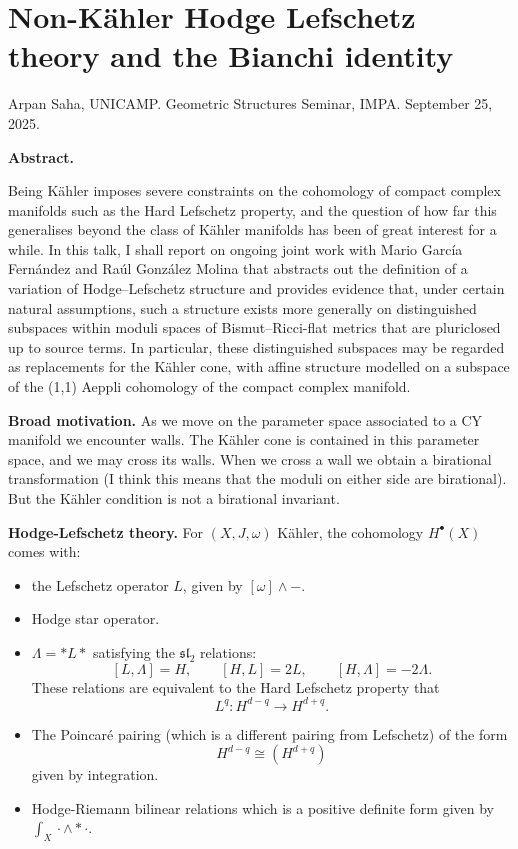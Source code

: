 \section{Non-Kähler Hodge Lefschetz theory
and the Bianchi identity}
\label{section-non-kahler-hodge-lefschetz-theory-and-bianchi-identity}

\noindent
Arpan Saha, UNICAMP.
Geometric Structures Seminar, IMPA. 
September 25, 2025.

\medskip
{\bf Abstract.} 

Being Kähler imposes severe constraints on the cohomology of compact complex
manifolds such as the Hard Lefschetz property, and the question of how far this
generalises beyond the class of Kähler manifolds has been of great interest for
a while. In this talk, I shall report on ongoing joint work with Mario García
Fernández and Raúl González Molina that abstracts out the definition of a
variation of Hodge--Lefschetz structure and provides evidence that, under
certain natural assumptions, such a structure exists more generally on
distinguished subspaces within moduli spaces of Bismut--Ricci-flat metrics that
are pluriclosed up to source terms. In particular, these distinguished subspaces
may be regarded as replacements for the Kähler cone, with affine structure
modelled on a subspace of the (1,1) Aeppli cohomology of the compact complex
manifold.

\medskip\noindent
{\bf Broad motivation.}
As we move on the parameter space associated
to a CY manifold we encounter walls.
The Kähler cone is contained in this
parameter space, and we may cross 
its walls. When we cross a wall
we obtain a birational transformation
(I think this means that the moduli
on either side are birational).
But the Kähler condition is not a 
birational invariant.

\medskip\noindent
{\bf Hodge-Lefschetz theory.}
For $(X,J,\omega)$ Kähler,
the cohomology $H^{\bullet}(X)$ comes with:
\begin{itemize}
\item the Lefschetz operator $L$,
given by $[\omega]\wedge-$.

\item Hodge star operator.
\item $\Lambda=* L *$ satisfying
the $\mathfrak{sl}_2$ relations:
$$
[L,\Lambda]=H,\qquad [H,L]=2L,\qquad [H,\Lambda]=-2\Lambda.
$$
These relations are equivalent to 
the Hard Lefschetz property that
$$
L^q:H^{d-q} \to H^{d+q}.
$$
\item The Poincaré pairing
(which is a different pairing from Lefschetz)
of the form
$$
H^{d-q}\cong (H^{d+q})
$$
given by integration.

\item Hodge-Riemann bilinear relations
which is a positive definite form given by
$\int_X\cdot \wedge *\cdot$.

\end{itemize}

